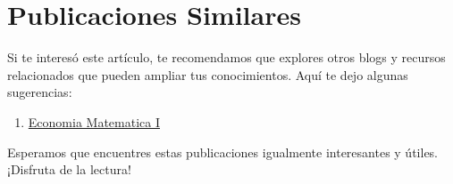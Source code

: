 \documentclass[
  doc,
  floatsintext,
  longtable,
  a4paper,
  nolmodern,
  notxfonts,
  notimes,
  12pt,
  colorlinks=true,linkcolor=blue,citecolor=blue,urlcolor=blue]{apa7}
\providecommand{\tightlist}{%
  \setlength{\itemsep}{0pt}\setlength{\parskip}{0pt}}
\begin{document}
\section{Publicaciones Similares}\label{publicaciones-similares}

Si te interesó este artículo, te recomendamos que explores otros blogs y
recursos relacionados que pueden ampliar tus conocimientos. Aquí te dejo
algunas sugerencias:

\begin{enumerate}
\def\labelenumi{\arabic{enumi}.}
\tightlist
\item
  \href{https://axiomata.netlify.app/economia-matematica/2025-04-14-economia-matematica-I/index.pdf}{}
  \href{https://axiomata.netlify.app/economia-matematica/2025-04-14-economia-matematica-I}{Economia
  Matematica I}
\end{enumerate}

Esperamos que encuentres estas publicaciones igualmente interesantes y
útiles. ¡Disfruta de la lectura!
\end{document}

